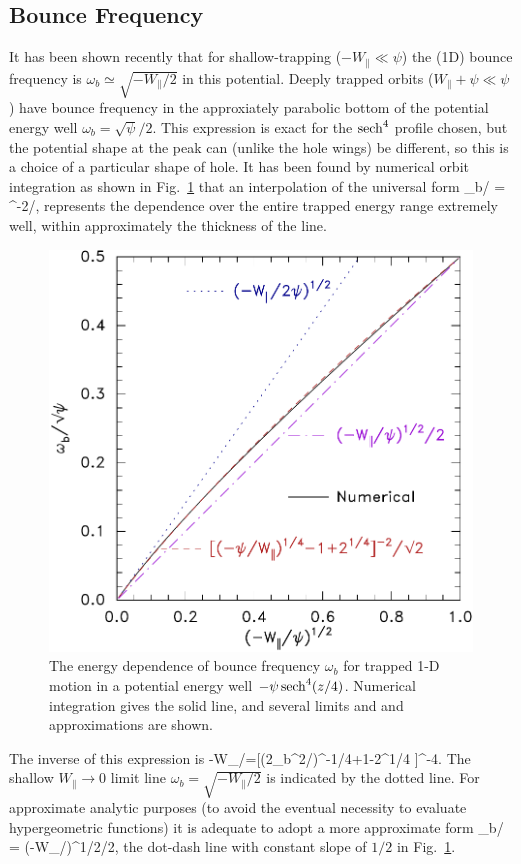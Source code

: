 \documentclass{agujournal2019}
\let\oldequation\equation
\let\oldendequation\endequation
\renewenvironment{equation}
  {\linenomathNonumbers\oldequation}
  {\oldendequation\endlinenomath}
\def\citep{\cite}
\begin{document}
\subsection{Bounce Frequency}
It has been shown recently \citep{Hutchinson2019a} that for shallow-trapping
($-W_\parallel\ll \psi$) the (1D) bounce frequency is
$\omega_b\simeq \sqrt{-W_\parallel/2}$ in this potential. Deeply
trapped orbits ($W_\parallel+\psi \ll \psi$) have bounce frequency in
the approxiately parabolic bottom of the potential energy well
$\omega_b=\sqrt{\psi}/2$. This expression is exact for the
${\rm sech}^4$ profile chosen, but the potential shape at the peak can
(unlike the hole wings) be different, so this is a choice of a
particular shape of hole.
It has been found by numerical orbit integration as shown in Fig.\
\ref{fig:omegabvW} that an interpolation of the universal form
\begin{equation}
  \label{eq:omegainterp}
  \omega_b/\sqrt{\psi} = 
^{-2}/,
\end{equation}
represents the dependence over the entire trapped energy range
extremely well, within approximately the thickness of the line. 
\begin{figure}%
  \centering
  \includegraphics[width=0.6\hsize]{omvwnext}
  \caption{The energy dependence of bounce frequency $\omega_b$ for
    trapped 1-D motion in a potential energy well
    $-\psi\,{\rm sech}^4(z/4)$. Numerical integration gives the solid
    line, and several limits and and approximations are shown.}
  \label{fig:omegabvW}
\end{figure}
The inverse of this expression is 
\begin{equation}
  \label{eq:omegainverse}
  -W_\parallel/\psi=[(2\omega_b^2/\psi)^{-1/4}+1-2^{1/4} ]^{-4}.
\end{equation}
The
shallow $W_\parallel \to 0$ limit line
$\omega_b= \sqrt{-W_\parallel/2}$ is indicated by the dotted line. 
For
approximate analytic purposes (to avoid the eventual necessity to
evaluate hypergeometric functions) it is adequate to adopt a more
approximate form
\begin{equation}
  \label{eq:omegaapprox}
  \omega_b/\sqrt{\psi} = (-W_\parallel/\psi)^{1/2}/2,
\end{equation}
the dot-dash line with constant slope of $1/2$  in Fig.\ \ref{fig:omegabvW}.
\end{document}
